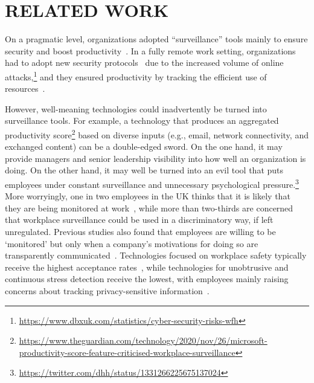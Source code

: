 \section{RELATED WORK}
\label{sec:related_work}

On a pragmatic level, organizations adopted ``surveillance'' tools mainly to ensure security and boost productivity~\cite{ball2010workplace}. In a fully remote work setting, organizations had to adopt new security protocols~\cite{mckinsey} due to the increased volume of online attacks,\footnote{\url{https://www.dbxuk.com/statistics/cyber-security-risks-wfh}} and they
ensured productivity by tracking the efficient use of resources~\cite{ball2010workplace}.

However, well-meaning technologies could inadvertently be turned into surveillance tools. For example, a technology that produces an aggregated productivity score\footnote{\url{https://www.theguardian.com/technology/2020/nov/26/microsoft-productivity-score-feature-criticised-workplace-surveillance}} based on diverse inputs (e.g., email, network connectivity, and exchanged content) can be a double-edged sword. On the one hand, it may provide managers and senior leadership visibility into how well an organization is doing. On the other hand, it may well be turned into an evil tool that puts employees under constant surveillance and unnecessary psychological pressure.\footnote{\url{https://twitter.com/dhh/status/1331266225675137024}} More worryingly, one in two employees in the UK thinks that it is likely that they are being monitored at work~\cite{tucsurvey}, while more than two-thirds are concerned that workplace surveillance could be used in a discriminatory way, if left unregulated. Previous studies also found that employees are willing to be `monitored' but only when a company's motivations for doing so are transparently communicated~\cite{marchant2019best}. Technologies focused on workplace safety typically receive the highest acceptance rates~\cite{jacobs2019employee}, while technologies for unobtrusive and continuous stress detection receive the lowest,  with employees mainly raising concerns about tracking privacy-sensitive information~\cite{kallio2021unobtrusive}.

